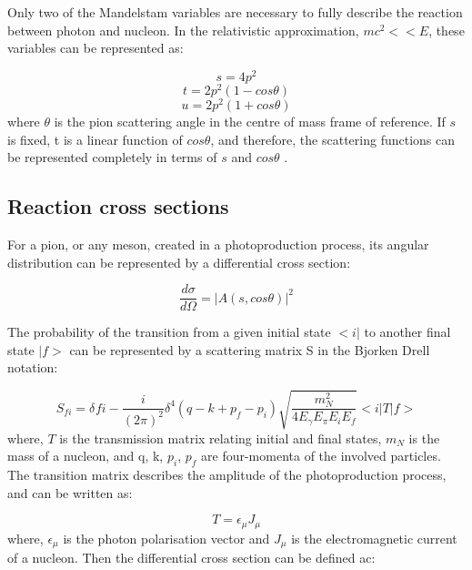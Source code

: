 \indent Only two of the Mandelstam variables are necessary to fully describe the reaction between photon and nucleon. In the relativistic approximation, $mc^{2}<<E$, these variables can be represented as:

\begin{equation}
s=4p^{2}
\end{equation}
\begin{equation}
t=2p^{2}(1-cos\theta)
\end{equation}
\begin{equation}
u=2p^{2}(1+cos\theta)
\end{equation}
where $\theta$ is the pion scattering angle in the centre of mass frame of reference. If $s$ is fixed, t is a linear function of $cos\theta$, and therefore, the scattering functions can be represented completely in terms of $s$ and $cos\theta$ \cite{bertulani}.

\subsection{Reaction cross sections}

\indent For a pion, or any meson, created in a photoproduction process, its angular distribution can be represented by a differential cross section:

\begin{equation}
\frac{d\sigma}{d\Omega}=|A(s,cos\theta)|^{2}
\end{equation}

\indent The probability of the transition from a given initial state $<i|$ to another final state $|f>$ can be represented by a scattering matrix S in the Bjorken Drell notation\cite{bjorken}:

\begin{equation}
S_{fi}=\delta_{}fi-\frac{i}{(2\pi)^{2}}\delta^{4}(q-k+p_{f}-p_{i})\sqrt{\frac{m_{N}^{2}}{4E_{\gamma}E_{\pi}E_{i}E_{f}}}<i|T|f>
\end{equation}
where, $T$ is the transmission matrix relating initial and final states, $m_{N}$ is the mass of a nucleon, and q, k, $p_{i}$, $p_{f}$ are four-momenta of the involved particles. The transition matrix describes the amplitude of the photoproduction process, and can be written as:

\begin{equation}
T=\epsilon_{\mu}J_{\mu}
\end{equation}
where, $\epsilon_{\mu}$ is the photon polarisation vector and $J_{\mu}$ is the electromagnetic current of a nucleon. Then the differential cross section can be defined ac:

